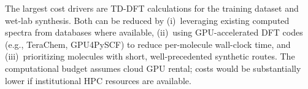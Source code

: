 \documentclass[11pt,a4paper]{article}
\begin{document}
\noindent The largest cost drivers are TD-DFT calculations for the training dataset and
wet-lab synthesis. Both can be reduced by (i)~leveraging existing computed spectra from
databases where available, (ii)~using GPU-accelerated DFT codes (e.g., TeraChem, GPU4PySCF)
to reduce per-molecule wall-clock time, and (iii)~prioritizing molecules with short,
well-precedented synthetic routes. The computational budget assumes cloud GPU rental;
costs would be substantially lower if institutional HPC resources are available.


\newpage


\end{document}
